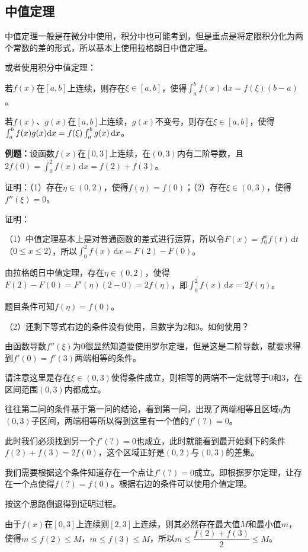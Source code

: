 \documentclass[UTF8, 12pt]{ctexart}
\begin{document}
\subsection{中值定理}

中值定理一般是在微分中使用，积分中也可能考到，但是重点是将定限积分化为两个常数的差的形式，所以基本上使用拉格朗日中值定理。

或者使用积分中值定理：

若$f(x)$在$[a,b]$上连续，则存在$\xi\in[a,b]$，使得$\int_a^bf(x)\,\textrm{d}x=f(\xi)(b-a)$。

若$f(x)$、$g(x)$在$[a,b]$上连续，$g(x)$不变号，则存在$\xi\in[a,b]$，使得$\int_a^bf(x)g(x)\,\\\textrm{d}x=f(\xi)\int_a^bg(x)\,\textrm{d}x$。

\textbf{例题：}设函数$f(x)$在$[0,3]$上连续，在$(0,3)$内有二阶导数，且$2f(0)=\int_0^2f(x)\,\textrm{d}x=f(2)+f(3)$。

证明：（1）存在$\eta\in(0,2)$，使得$f(\eta)=f(0)$；（2）存在$\xi\in(0,3)$，使得$f''(\xi)=0$。

证明：

（1）中值定理基本上是对普通函数的差式进行运算，所以令$F(x)=f_0^xf(t)\,\textrm{d}t$（$0\leqslant x\leqslant2$），所以$\int_0^2f(x)\,\textrm{d}x=F(2)-F(0)$。

由拉格朗日中值定理，存在$\eta\in(0,2)$，使得$F(2)-F(0)=F'(\eta)(2-0)=2f(\eta)$，即$\int_0^2f(x)\,\textrm{d}x=2f(\eta)$。

题目条件可知$f(\eta)=f(0)$。

（2）还剩下等式右边的条件没有使用，且数字为2和3。如何使用？

由函数导数$f''(\xi)$为0很显然知道要使用罗尔定理，但是这是二阶导数，就要求得到$f'(0)=f'(3)$两端相等的条件。

请注意这里是存在$\xi\in(0,3)$使得条件成立，则相等的两端不一定就等于0和3，在区间范围$(0,3)$内都成立。

往往第二问的条件基于第一问的结论，看到第一问，出现了两端相等且区域$\eta$为$(0,3)$子区间，两端相等所以得到这里有一个值的$f'(?)=0$。

此时我们必须找到另一个$f'(?)=0$也成立，此时就能看到最开始剩下的条件$f(2)+f(3)=2f(0)$，这个区域正好是$(0,2)$与$(0,3)$的差集。

我们需要根据这个条件知道存在一个点让$f'(?)=0$成立。即根据罗尔定理，让存在一个点使得$f(?)=f(0)$。根据右边的条件可以使用介值定理。

按这个思路倒退得到证明过程。

由于$f(x)$在$[0,3]$上连续则$[2,3]$上连续，则其必然存在最大值$M$和最小值$m$，使得$m\leqslant f(2)\leqslant M$，$m\leqslant f(3)\leqslant M$，所以$m\leqslant\dfrac{f(2)+f(3)}{2}\leqslant M$。
\end{document}
